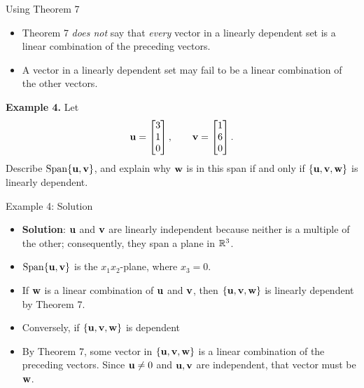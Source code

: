 \begin{frame}{Using Theorem 7}
\begin{itemize}
\item Theorem 7 \textit{does not} say that \textit{every} vector in a linearly dependent set is
a linear combination of the preceding vectors.\pause
\item A vector in a linearly dependent set may fail to be a linear combination
of the other vectors.\pause
\end{itemize}
\textbf{Example 4.} Let
\[
\mathbf{u}=\begin{bmatrix}3\\1\\0\end{bmatrix},\qquad
\mathbf{v}=\begin{bmatrix}1\\6\\0\end{bmatrix}.
\]
\pause
Describe $\operatorname{Span}\{\mathbf{u},\mathbf{v}\}$, and explain why $\mathbf{w}$ is in this span
if and only if $\{\mathbf{u},\mathbf{v},\mathbf{w}\}$ is linearly dependent.
\end{frame}

\begin{frame}{Example 4: Solution}
\begin{itemize}
\item \textbf{Solution}: $\mathbf{u}$ and $\mathbf{v}$ are linearly independent because neither is a
multiple of the other; consequently, they span a plane in \pause $\mathbb{R}^3$.
\item $\operatorname{Span}\{\mathbf{u},\mathbf{v}\}$ is the $x_1x_2$-plane, where $x_3=0$.\pause
\item If $\mathbf{w}$ is a linear combination of $\mathbf{u}$ and $\mathbf{v}$, then
$\{\mathbf{u},\mathbf{v},\mathbf{w}\}$ is linearly dependent by Theorem 7.
\item Conversely, if $\{\mathbf{u},\mathbf{v},\mathbf{w}\}$ is dependent\pause
\item By Theorem 7, some vector in $\{\mathbf{u},\mathbf{v},\mathbf{w}\}$ is a linear combination of the preceding vectors. Since
$\mathbf{u}\ne0$ and $\mathbf{u},\mathbf{v}$ are independent, that vector must be $\mathbf{w}$.
\end{itemize}
\end{frame}

